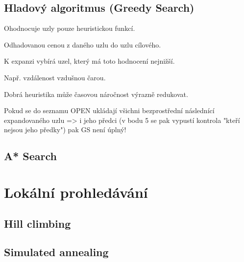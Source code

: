 \subsection{Hladový algoritmus (Greedy Search)}

\begin{compactitem}
    \item {}

    \item Ohodnocuje uzly pouze heuristickou funkcí. \begin{compactitem}
        \item Odhadovanou cenou z daného uzlu do uzlu cílového.
        \item K expanzi vybírá uzel, který má toto hodnocení nejnižší.
        \item Např. vzdálenost vzdušnou čarou.
    \end{compactitem}

    \item Dobrá heuristika může časovou náročnost výrazně redukovat.

    \item Pokud se do seznamu OPEN ukládají všichni bezprostřední následnící expandovaného uzlu => i jeho předci (v bodu 5 se pak vypustí kontrola "kteří nejsou jeho předky") pak GS není úplný!
\end{compactitem}







\subsection{A* Search}



\section{Lokální prohledávání}


\subsection{Hill climbing}


\subsection{Simulated annealing}

